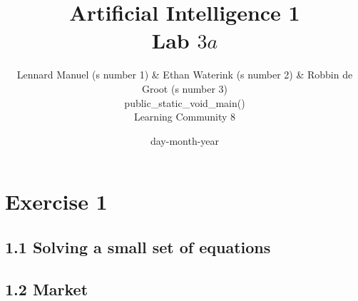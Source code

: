 \documentclass{article}
\title{{\bf Artificial Intelligence 1} \\ Lab $3a$}%
\author{
Lennard Manuel (s number 1) \& Ethan Waterink (s number 2) \& Robbin de Groot (s number 3) \\
public\_static\_void\_main() \\
Learning Community 8
} %
\date{day-month-year}%
\begin{document}
\maketitle

\section*{Exercise 1}
\subsection*{1.1 \hspace*{0.3cm} Solving a small set of equations}
\subsection*{1.2 \hspace*{0.3cm} Market}
\end{document}
